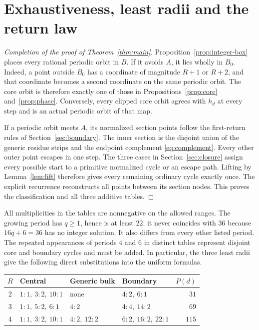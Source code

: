 \section{Exhaustiveness, least radii and the return law}\label{sec:assembly}

\begin{proof}[Completion of the proof of Theorem~\ref{thm:main}]
Proposition~\ref{prop:integer-box} places every rational periodic
orbit in $B$. If it avoids $A$, it lies wholly in $B_0$.
Indeed, a point outside $B_0$ has a coordinate of magnitude $R+1$
or $R+2$, and that coordinate becomes a second coordinate on the
same periodic orbit. The core orbit is therefore exactly one of
those in Propositions~\ref{prop:core} and~\ref{prop:phase}.
Conversely, every clipped core orbit agrees with $h_d$ at every
step and is an actual periodic orbit of that map.

If a periodic orbit meets $A$, its normalized section points
follow the first-return rules of Section~\ref{sec:boundary}.
The inner section is the disjoint union of the generic residue
strips and the endpoint complement \eqref{eq:complement}.
Every other outer point escapes in one step. The three cases in
Section~\ref{sec:closure} assign every possible start to a
primitive normalized cycle or an escape path. Lifting by
Lemma~\ref{lem:lift} therefore gives every remaining ordinary
cycle exactly once. The explicit recurrence reconstructs all
points between its section nodes. This proves the classification
and all three additive tables.
\end{proof}

All multiplicities in the tables are nonnegative on the allowed
ranges. The growing period has $q\ge1$, hence is at least $22$;
it never coincides with $36$ because $16q+6=36$ has no integer
solution. It also differs from every other listed period. The
repeated appearances of periods $4$ and $6$ in distinct tables
represent disjoint core and boundary cycles and must be added.
In particular, the three least radii give the following direct
substitutions into the uniform formulas.

\begin{center}
\begin{minipage}{\linewidth}
\centering
\begin{tabular}{clllr}
\toprule
$R$ & Central & Generic bulk & Boundary & $P(d)$\\
\midrule
$2$ & $1:1,\ 3:2,\ 10:1$ & none & $4:2,\ 6:1$ & $31$\\
$3$ & $1:1,\ 5:2,\ 6:1$ & $4:2$ & $4:4,\ 14:2$ & $69$\\
$4$ & $1:1,\ 3:2,\ 10:1$ & $4:2,\ 12:2$ &
       $6:2,\ 16:2,\ 22:1$ & $115$\\
\bottomrule
\end{tabular}
\label{tab:small}
\end{minipage}
\end{center}

